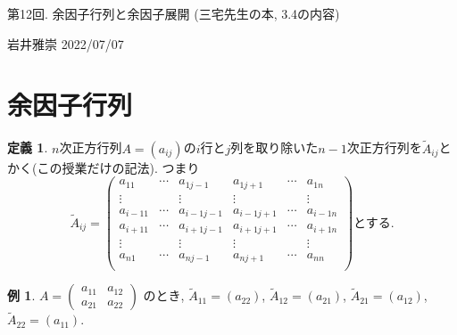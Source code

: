 \documentclass[dvipdfmx,a4paper,11pt]{article}
\theoremstyle{definition}
\newtheorem{dfn}[thm]{定義}
\newtheorem{exa}[thm]{例}
\begin{document}
\begin{center}
{\Large 第12回. 余因子行列と余因子展開 (三宅先生の本, 3.4の内容)} 
\end{center}

\begin{flushright}
 岩井雅崇 2022/07/07
\end{flushright}


\section{余因子行列}

\begin{tcolorbox}[
    colback = white,
    colframe = green!35!black,
    fonttitle = \bfseries,
    breakable = true]
    \begin{dfn}
    $n$次正方行列$A=(a_{ij})$の$i$行と$j$列を取り除いた$n-1$次正方行列を$\tilde{A}_{ij}$とかく(この授業だけの記法). つまり
  $$
  \tilde{A}_{ij}
  =
    \begin{pmatrix}
a_{11}&   \cdots &a_{1j-1}&a_{1j+1}&\cdots&a_{1n} \\
\vdots&   		& \vdots &\vdots &   		&\vdots  \\
a_{i-11}&   \cdots &a_{i-1j-1}&a_{i-1j+1}&\cdots&a_{i-1n} \\
a_{i+11}&   \cdots &a_{i+1j-1}&a_{i+1j+1}&\cdots&a_{i+1n} \\
\vdots&   		& \vdots &\vdots &   		&\vdots  \\
a_{n1}&   \cdots &a_{nj-1}&a_{nj+1}&\cdots&a_{nn} \\
\end{pmatrix}
\text{とする.}
$$
    \end{dfn}
 \end{tcolorbox}
\begin{exa}
$A=
\begin{pmatrix}
a_{11} & a_{12} \\
a_{21} & a_{22}
\end{pmatrix}
$
のとき, 
$  \tilde{A}_{11} =(a_{22})$, $  \tilde{A}_{12} =(a_{21})$, $  \tilde{A}_{21} =(a_{12})$, $  \tilde{A}_{22} =(a_{11})$.
\end{exa}
\end{document}
